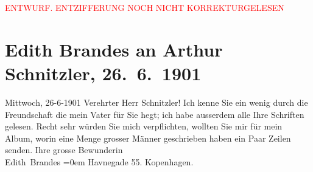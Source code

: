 
\begin{center}
            \textcolor{red}{ENTWURF. ENTZIFFERUNG NOCH NICHT KORREKTURGELESEN}
                      \end{center}
            
               \section[Edith Brandes an Arthur Schnitzler, 26. 6. 1901]{ Edith Brandes an Arthur Schnitzler, 26. 6. 1901}\nopagebreak{}\rehead{ }\begin{ledgroupsized}[t]{13cm}\normalsize\beginnumbering{} \toendnotes[C]{\smallbreak\pagebreak[2]} 
\toendnotes[C]{\smallbreak}\pstart
           \raggedleft{}{\pb}Mittwoch, 26-6-1901\pend
           \pstart{}Verehrter Herr Schnitzler!\pend\pstart
           Ich kenne Sie ein wenig durch die Freundschaft die mein Vater für Sie hegt; ich habe
                    ausserdem alle Ihre Schriften gelesen. Recht sehr würden Sie mich verpflichten,
                    wollten Sie mir für mein Album, worin eine Menge grosser Männer geschrieben
                    haben ein Paar Zeilen senden.\pend
           \pstart
           Ihre grosse Bewunderin{\\[\baselineskip]}\spacefill\mbox{Edith Brandes}\pend
           \leftskip=0em{}\pstart
           \noindent{}Havnegade 55. Kopenhagen.\pend
           \endnumbering{}\end{ledgroupsized}  \newcommand{\dateiname}{L01135}\newcommand{\titel}{Edith Brandes an Arthur Schnitzler, 26. 6. 1901}\newcommand{\editorInnen}{Martin Anton Müller und Gerd-Hermann Susen}
      